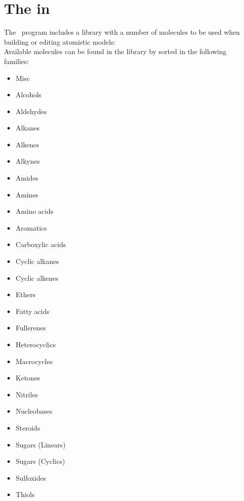 \chapter{The  in \atomes}
\label{lib}

The \atomes\ program includes a library with a number of molecules to be used when building or editing atomistic models: \\
\laf Available molecules can be found in the library by sorted in the following families: \\[0.5cm]
\begin{minipage}{5cm} 
\begin{itemize}
\item Misc
\item Alcohols
\item Aldehydes
\item Alkanes
\item Alkenes
\item Alkynes
\item Amides
\item Amines
\item Amino acids
\end{itemize}
\end{minipage}
\begin{minipage}{5cm} 
\begin{itemize}
\item Aromatics
\item Carboxylic acids
\item Cyclic alkanes
\item Cyclic alkenes
\item Ethers
\item Fatty acids
\item Fullerenes
\item Heterocyclics
\item Macrocycles
\end{itemize}
\end{minipage}
\begin{minipage}{5cm} 
\begin{itemize}
\item Ketones
\item Nitriles
\item Nucleobases
\item Steroids
\item Sugars (Linears)
\item Sugars (Cyclics)
\item Sulfoxides
\item Thiols
\end{itemize}
\end{minipage}
